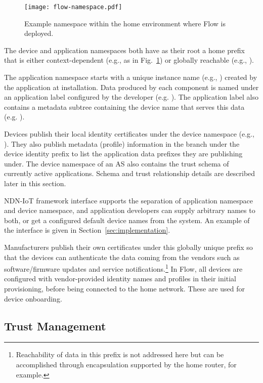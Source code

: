 \begin{figure}[!t]
\centering
\texttt{[image: flow-namespace.pdf]}
\caption{Example namespace within the home environment where Flow is deployed.}
\label{fig:flow-namespace}
\end{figure}

The device and application namespaces both have as their root a home prefix that is either context-dependent (e.g.,  as in Fig.~\ref{fig:flow-namespace}) or globally reachable (e.g., ).

The application namespace starts with a unique instance name (e.g., ) created by the application at installation. 
Data produced by each component is named under an application label configured by the developer (e.g. ). 
The application label also contains a metadata subtree containing the device name that serves this data (e.g. ).

Devices publish their local identity certificates under the device namespace (e.g., ).
They also publish metadata (profile) information in the  branch under the device identity prefix to list the application data prefixes they are publishing under. 
The device namespace of an AS also contains the trust schema of currently active applications. 
Schema and trust relationship details are described later in this section.

NDN-IoT framework interface supports the separation of application namespace and device namespace, and application developers can supply arbitrary names to both, or get a configured default device names from the system. 
An example of the interface is given in Section~\ref{sec:implementation}.

Manufacturers publish their own certificates under this globally unique prefix so that the devices can authenticate the data coming from the vendors such as software/firmware updates and service notifications.\footnote{Reachability of data in this prefix is not addressed here but can be accomplished through encapsulation supported by the home router, for example.}
In Flow, all devices are configured with vendor-provided identity names and profiles in their initial provisioning, before being connected to the home network.
These are used for device onboarding.

\subsection{Trust Management}
\label{sec:trust-management}

